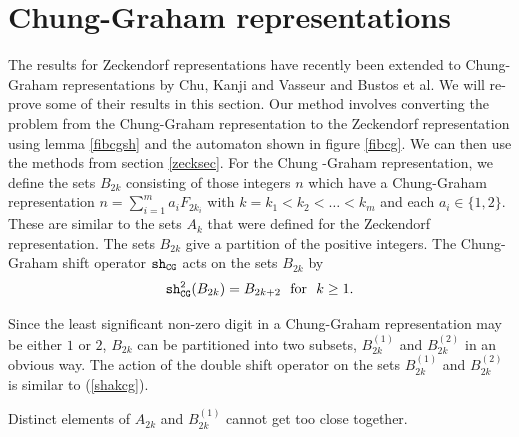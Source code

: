 \documentclass[12pt]{article}
\theoremstyle{plain}
\theoremstyle{case}
\theoremstyle{definition}
\begin{document}
\bigskip

\section{Chung-Graham representations}
The results for Zeckendorf representations have recently been extended to Chung-Graham representations by Chu, Kanji and Vasseur\cite{Chu:2025aa} and Bustos et al.\cite{Bustos:2025aa} We will re-prove some of their results in this section. Our method involves converting the problem from the Chung-Graham representation to the Zeckendorf representation using lemma \ref{fibcgsh} and the automaton shown in figure \ref{fibcg}. We can then use the methods from section \ref{zecksec}. For the Chung -Graham representation, we define the sets $B_{2k}$ consisting of those integers $n$ which have a Chung-Graham representation  $n = \sum_{i = 1}^m a_{i} F_{2 k_i}$ with $k = k_1 < k_2 < \dots < k_m$ and each $a_{i} \in \{1, 2 \}$.  These are similar to the sets $A_k$ that were defined for the Zeckendorf representation. The sets $B_{2k}$ give a partition of the positive integers. The Chung-Graham shift operator ${\tt sh_{CG}}$ acts on the sets  $B_{2k}$ by
\begin{equation}
\label{shakcg}
{\tt sh_{CG}^2} (B_{2k}) = B_{2k+2} \,\, \text{  for  } \,\, k \geq 1.
\end{equation}

Since the least significant non-zero digit in a Chung-Graham representation may be either $1$ or $2$, $B_{2k}$ can be partitioned into two subsets, $B_{2k}^{(1)}$ and $B_{2k}^{(2)}$ in an obvious way. The action of the double shift operator on the sets $B_{2k}^{(1)}$ and $B_{2k}^{(2)}$ is similar to (\ref{shakcg}).

Distinct elements of $A_{2k}$ and $B_{2k}^{(1)}$ cannot get too close together.

\bigskip
\end{document}
